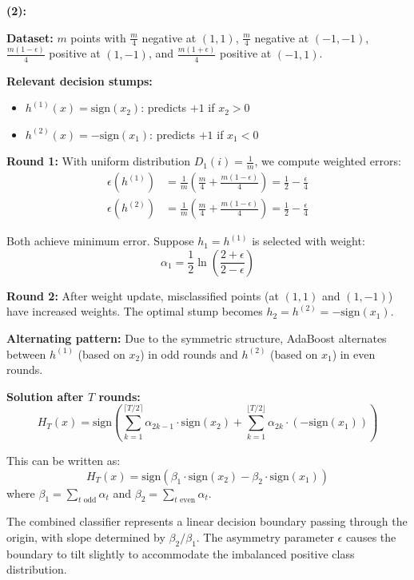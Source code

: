 \documentclass[letterpaper, 11pt]{article}
\newcommand{\1}{\mathds{1}}	%
\theoremstyle{definition}
\begin{document}
\textbf{(2):}

\textbf{Dataset:} $m$ points with $\frac{m}{4}$ negative at $(1,1)$, $\frac{m}{4}$ negative at $(-1,-1)$, $\frac{m(1-\epsilon)}{4}$ positive at $(1,-1)$, and $\frac{m(1+\epsilon)}{4}$ positive at $(-1,1)$.

\textbf{Relevant decision stumps:}
\begin{itemize}
    \item $h^{(1)}(x) = \text{sign}(x_2)$: predicts $+1$ if $x_2 > 0$
    \item $h^{(2)}(x) = -\text{sign}(x_1)$: predicts $+1$ if $x_1 < 0$
\end{itemize}

\textbf{Round 1:} With uniform distribution $D_1(i) = \frac{1}{m}$, we compute weighted errors:
\begin{align*}
\epsilon(h^{(1)}) &= \frac{1}{m}\left(\frac{m}{4} + \frac{m(1-\epsilon)}{4}\right) = \frac{1}{2} - \frac{\epsilon}{4} \\
\epsilon(h^{(2)}) &= \frac{1}{m}\left(\frac{m}{4} + \frac{m(1-\epsilon)}{4}\right) = \frac{1}{2} - \frac{\epsilon}{4}
\end{align*}

Both achieve minimum error. Suppose $h_1 = h^{(1)}$ is selected with weight:
$$\alpha_1 = \frac{1}{2}\ln\left(\frac{2+\epsilon}{2-\epsilon}\right)$$

\textbf{Round 2:} After weight update, misclassified points (at $(1,1)$ and $(1,-1)$) have increased weights. The optimal stump becomes $h_2 = h^{(2)} = -\text{sign}(x_1)$.

\textbf{Alternating pattern:} Due to the symmetric structure, AdaBoost alternates between $h^{(1)}$ (based on $x_2$) in odd rounds and $h^{(2)}$ (based on $x_1$) in even rounds.

\textbf{Solution after $T$ rounds:}
$$H_T(x) = \text{sign}\left(\sum_{k=1}^{\lceil T/2 \rceil} \alpha_{2k-1} \cdot \text{sign}(x_2) + \sum_{k=1}^{\lfloor T/2 \rfloor} \alpha_{2k} \cdot (-\text{sign}(x_1))\right)$$

This can be written as:
$$H_T(x) = \text{sign}\left(\beta_1 \cdot \text{sign}(x_2) - \beta_2 \cdot \text{sign}(x_1)\right)$$
where $\beta_1 = \sum_{t \text{ odd}} \alpha_t$ and $\beta_2 = \sum_{t \text{ even}} \alpha_t$.

The combined classifier represents a linear decision boundary passing through the origin, with slope determined by $\beta_2/\beta_1$. The asymmetry parameter $\epsilon$ causes the boundary to tilt slightly to accommodate the imbalanced positive class distribution.
\end{document}
